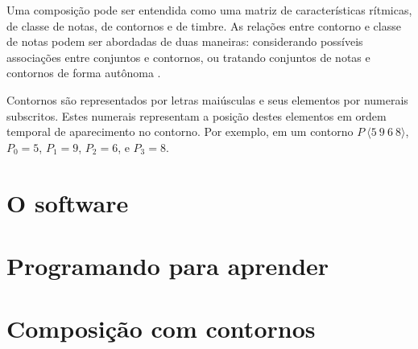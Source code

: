 \documentclass{article}
\begin{document}
Uma composição pode ser entendida como uma matriz de características
rítmicas, de classe de notas, de contornos e de timbre. As relações
entre contorno e classe de notas podem ser abordadas de duas maneiras:
considerando possíveis associações entre conjuntos e contornos, ou
tratando conjuntos de notas e contornos de forma autônoma
\cite{friedmann85:methodology}.

Contornos são representados por letras maiúsculas e seus elementos por
numerais subscritos. Estes numerais representam a posição destes
elementos em ordem temporal de aparecimento no contorno. Por exemplo,
em um contorno $P\:\langle5\:9\:6\:8\rangle$, $P_0 = 5$, $P_1 = 9$,
$P_2 = 6$, e $P_3 = 8$.

\section{O software}
\label{sec:o-software}

\section{Programando para aprender}
\label{sec:progr-para-aprend}

\section{Composição com contornos}
\label{sec:comp-com-cont}

\renewcommand{\refname}{Referências Bibliográficas}


\end{document}
